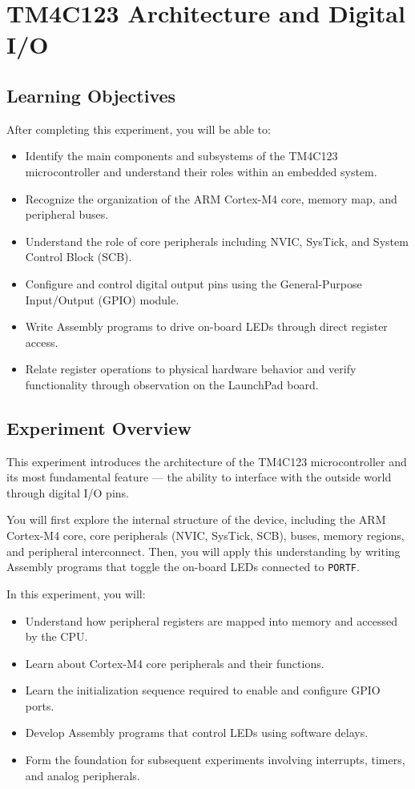 \chapter{TM4C123 Architecture and Digital I/O}

\section*{Learning Objectives}
After completing this experiment, you will be able to:
\begin{itemize}[nosep]
  \item Identify the main components and subsystems of the TM4C123 microcontroller and understand their roles within an embedded system.
  \item Recognize the organization of the ARM Cortex-M4 core, memory map, and peripheral buses.
  \item Understand the role of core peripherals including NVIC, SysTick, and System Control Block (SCB).
  \item Configure and control digital output pins using the General-Purpose Input/Output (GPIO) module.
  \item Write Assembly programs to drive on-board LEDs through direct register access.
  \item Relate register operations to physical hardware behavior and verify functionality through observation on the LaunchPad board.
\end{itemize}

\section*{Experiment Overview}
This experiment introduces the architecture of the TM4C123 microcontroller and its most fundamental feature — the ability to interface with the outside world through digital I/O pins.

\noindent You will first explore the internal structure of the device, including the ARM Cortex-M4 core, core peripherals (NVIC, SysTick, SCB), buses, memory regions, and peripheral interconnect. Then, you will apply this understanding by writing Assembly programs that toggle the on-board LEDs connected to \texttt{PORTF}.

\noindent In this experiment, you will:
\begin{itemize}[nosep]
  \item Understand how peripheral registers are mapped into memory and accessed by the CPU.
  \item Learn about Cortex-M4 core peripherals and their functions.
  \item Learn the initialization sequence required to enable and configure GPIO ports.
  \item Develop Assembly programs that control LEDs using software delays.
  \item Form the foundation for subsequent experiments involving interrupts, timers, and analog peripherals.
\end{itemize}

